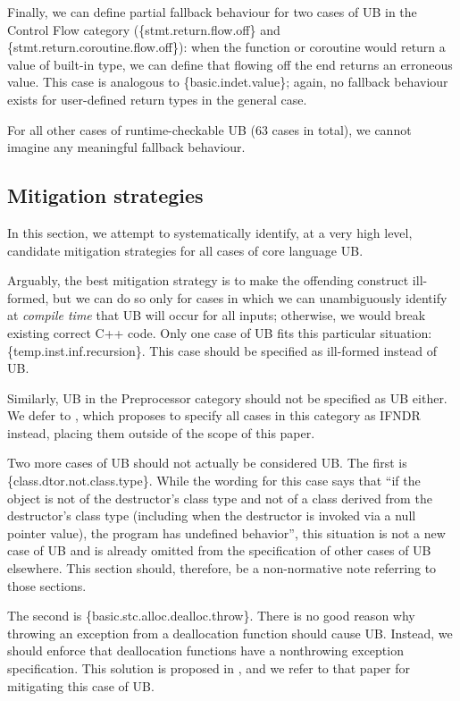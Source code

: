 Finally, we can define partial fallback behaviour for two cases of UB in the Control Flow category  (\{stmt.return.flow.off\} and \{stmt.return.coroutine.flow.off\}): when the function or coroutine would return a value of built-in type, we can define that flowing off the end returns an erroneous value. This case is analogous to \{basic.indet.value\}; again, no fallback behaviour exists for user-defined return types in the general case.

For all other cases of runtime-checkable UB (63 cases in total), we cannot imagine any meaningful fallback behaviour.

\subsection{Mitigation strategies}
\label{mitigation}

In this section, we attempt to systematically identify, at a very high level, candidate mitigation strategies for all cases of core language UB.

Arguably, the best mitigation strategy is to make the offending construct ill-formed, but we can do so only for cases in which we can unambiguously identify at \emph{compile time} that UB will occur for all inputs; otherwise, we would break existing correct C++ code. Only one case of UB fits this particular situation: 
\{temp.inst.inf.recursion\}. This case should be specified as ill-formed instead of UB.

Similarly, UB in the Preprocessor category should not be specified as UB either. We defer to \cite{P2843R2}, which proposes to specify all cases in this category as IFNDR instead, placing them outside of the scope of this paper.

Two more cases of UB should not actually be considered UB. The first is \{class.dtor.not.class.type\}. While the wording for this case says that ``if the object is not of the destructor's class type and not of a class derived from the destructor's class type (including when the destructor is invoked via a null pointer value), the program has undefined behavior'',
this situation is not a new case of UB and is already omitted from the specification of other cases of UB elsewhere. This section should, therefore, be a non-normative note referring to those sections.

The second is \{basic.stc.alloc.dealloc.throw\}. There is no good reason why throwing an exception from a deallocation function should cause UB. Instead, we should enforce that deallocation functions have a nonthrowing exception specification. This solution is proposed in \cite{P3424R0}, and we refer to that paper for mitigating this case of UB.

